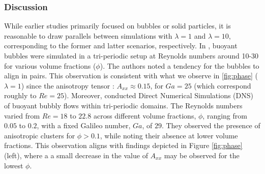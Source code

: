 \subsubsection*{Discussion}
While earlier studies primarily focused on bubbles or solid particles, it is reasonable to draw parallels between simulations with $\lambda = 1$ and $\lambda = 10$, corresponding to the former and latter scenarios, respectively. In \citet{bunner2002dynamics}, buoyant bubbles were simulated in a tri-periodic setup at Reynolds numbers around 10-30 for various volume fractions ($\phi$). The authors noted a tendency for the bubbles to align in pairs.%
This observation is consistent with what we observe in \ref{fig:phase} ($\lambda = 1$) since the anisotropy tensor : $A_{xx} \approx 0.15$, for $Ga = 25$ (which correspond roughly to $Re = 25$). 
Moreover, \citet{zhang2021direct} conducted Direct Numerical Simulations (DNS) of buoyant bubbly flows within tri-periodic domains. The Reynolds numbers varied from $Re=18$ to $22.8$ across different volume fractions, $\phi$, ranging from $0.05$ to $0.2$, with a fixed Galileo number, $Ga$, of $29$. They observed the presence of anisotropic clusters for $\phi > 0.1$, while noting their absence at lower volume fractions. This observation aligns with findings depicted in Figure \ref{fig:phase} (left), where a a small decrease in the value of $A_{xx}$ may be observed for the lowest $\phi$.


